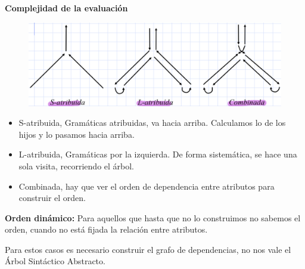 \documentclass[12pt, twoside, openright]{report} %
\begin{document}
\textbf{Complejidad de la evaluación}
\begin{figure}[H]
  {\includegraphics[scale=.25]{2021-05-01 01_46_28-05_resum_Sem_2021.pdf - Foxit Reader.png}}
\end{figure}
\begin{itemize}
  \item S-atribuida, Gramáticas atribuidas, va hacia arriba. Calculamos lo de los hijos y lo pasamos hacia arriba.
  \item L-atribuida, Gramáticas por la izquierda. De forma sistemática, se hace una sola visita, recorriendo el árbol.
  \item Combinada, hay que ver el orden de dependencia entre atributos para construir el orden.
\end{itemize}

\textbf{Orden dinámico:} Para aquellos que hasta que no lo construimos no sabemos el orden, cuando no está fijada la relación entre atributos.
  
Para estos casos es necesario construir el grafo de dependencias, no nos vale el Árbol Sintáctico Abstracto.
\end{document}
